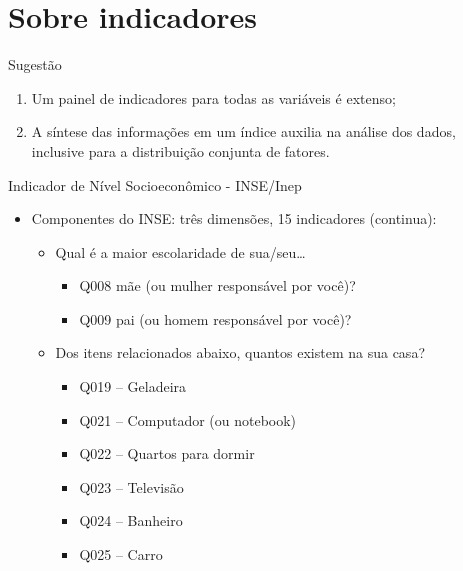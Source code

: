 \documentclass[
  ignorenonframetext,
]{beamer}
\providecommand{\tightlist}{%
  \setlength{\itemsep}{0pt}\setlength{\parskip}{0pt}}
\begin{document}
\hypertarget{sobre-indicadores}{%
\section{Sobre indicadores}\label{sobre-indicadores}}

\begin{frame}
Sugestão

\begin{enumerate}
\tightlist
\item
  Um painel de indicadores para todas as variáveis é extenso;
\item
  A síntese das informações em um índice auxilia na análise dos dados,
  inclusive para a distribuição conjunta de fatores.
\end{enumerate}
\end{frame}

\begin{frame}
Indicador de Nível Socioeconômico - INSE/Inep

\begin{itemize}
\tightlist
\item
  Componentes do INSE: três dimensões, 15 indicadores (continua):

  \begin{itemize}
  \tightlist
  \item
    Qual é a maior escolaridade de sua/seu\ldots{}

    \begin{itemize}
    \tightlist
    \item
      Q008 mãe (ou mulher responsável por você)?
    \item
      Q009 pai (ou homem responsável por você)?
    \end{itemize}
  \item
    Dos itens relacionados abaixo, quantos existem na sua casa?

    \begin{itemize}
    \tightlist
    \item
      Q019 -- Geladeira
    \item
      Q021 -- Computador (ou notebook)
    \item
      Q022 -- Quartos para dormir
    \item
      Q023 -- Televisão
    \item
      Q024 -- Banheiro
    \item
      Q025 -- Carro
    \end{itemize}
  \end{itemize}
\end{itemize}
\end{frame}
\end{document}
